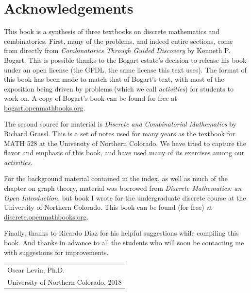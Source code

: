 \documentclass[10pt,]{book}
\theoremstyle{plain}
\theoremstyle{definition}
\theoremstyle{definition}
\theoremstyle{definition}
\numberwithin{equation}{chapter}
\begin{document}
\chapter*{Acknowledgements}\label{acknowledgement-1}
\hypertarget{p-1}{}%
This book is a synthesis of three textbooks on discrete mathematics and combinatorics.  First, many of the problems, and indeed entire sections, come from directly from \textsl{Combinatorics Through Guided Discovery} by Kenneth P. Bogart.  This is possible thanks to the Bogart estate's decision to release his book under an open license (the GFDL, the same license this text uses).  The format of this book has been made to match that of Bogart's text, with most of the exposition being driven by problems (which we call \emph{activities}) for students to work on.  A copy of Bogart's book can be found for free at \href{}{bogart.openmathbooks.org}.%
\par
\hypertarget{p-2}{}%
The second source for material is \textsl{Discrete and Combinatorial Mathematics} by Richard Grassl.  This is a set of notes used for many years as the textbook for MATH 528 at the University of Northern Colorado.  We have tried to capture the flavor and emphasis of this book, and have used many of its exercises among our \emph{activities}.%
\par
\hypertarget{p-3}{}%
For the background material contained in the index, as well as much of the chapter on graph theory, material was borrowed from \textsl{Discrete Mathematics: an Open Introduction}, but book I wrote for the undergraduate discrete course at the University of Northern Colorado.  This book can be found (for free) at \href{}{discrete.openmathbooks.org}.%
\par
\hypertarget{p-4}{}%
Finally, thanks to Ricardo Diaz for his helpful suggestions while compiling this book.  And thanks in advance to all the students who will soon be contacting me with suggestions for improvements.%
\par\hfill\begin{tabular}{l@{}}
Oscar Levin, Ph.D.\\
University of Northern Colorado, 2018
\end{tabular}\\\par
\end{document}
